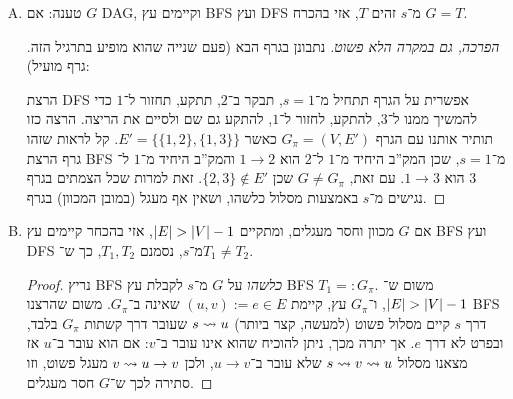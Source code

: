 \documentclass[]{../../../../tex/classes/homework}
\newcommand\ff{\mathrm{f}}
\begin{document}
\begin{enumerate}[(A)]
\begin{proof}[הוכחה בהנחה שהגרף פשוט]
			עתה נוכיח ש־$G$ חסר מעגלים. נניח בשלילה שב־$G$ יש מעגל באורך $n$. נניח שבזמן $t$ מתגלה הצומת הראשון במעגל $v_1$ (כלומר $\dd[v] = t$). בעת כלשהי בעת הרצת DFS-visit על $v$ (כלומר לפני $\ff[v]$), בהכרח נמצא $v_2$ כלשהו נוסף על המעגל, כי בינו לבין $v$ יש מסלול לבן בזמן $\dd[v]$. באינדוקציה, נבחין שבין $v_i$ לבין יתר צמתי המעגל שלא נמצאו יש מסלול לבן ב־$\dd[v_i]$, ולכן קיים $v_{i + 1}$ על המעגל שימצא לאחר $v_i$. סה''כ, נוכל למצוא קודקודים $v_1 \dots v_n$ כך ש־$I_{v_1} \subset I_{v_2} \subset \cdots \subset I_{v_n}$. כלומר, ישנו מסלול (מכוון ב־$G_{\pi}$, כי זהו תמיד גרף מכוון) $v_1 \to v_2 \squig v_n$, ומהשוויון, גם בגרף ה־BFS. מכאן שיש מק''ב $s \squig v_1 \squig v_n$, באורך $\dg(s, v_1) + n$, אך המסלול $s \squig v_1 \to v_n$ (שקיים כי $v_1 \dots v_n$ מעגל) קצר יותר (בהנחה ש־$n > 2$, שכן אחרת ישנן קשתות חוזרות והגרף איננו פשוט). 
		\end{proof}
		\item טענה: אם $G$ DAG, וקיימים עץ BFS ועץ DFS מ־$s$ זהים $T$, אזי בהכרח $G =T$.
		\begin{proof}[הפרכה, גם במקרה הלא פשוט]
			נתבונן בגרף הבא (פעם שנייה שהוא מופיע בתרגיל הזה. גרף מועיל): 
			\begin{center}
				\sen{}\she
			\end{center}
			הרצת DFS אפשרית על הגרף תתחיל מ־$s = 1$, תבקר ב־$2$, תתקע, תחזור ל־$1$ כדי להמשיך ממנו ל־$3$, להתקע, לחזור ל־$1$, להתקע גם שם ולסיים את הריצה. הרצה כזו תותיר אותנו עם הגרף $G_{\pi} = (V, E')$ כאשר $E' = \{\{1, 2\}, \{1, 3\}\}$. קל לראות שזהו גרף הרצת BFS מ־$s=1$, שכן המק''ב היחיד מ־$1$ ל־$2$ הוא $1 \to 2$ והמק''ב היחיד מ־$1$ ל־$3$ הוא $1 \to 3$. עם זאת, $G \neq G_\pi$ שכן $\{2, 3\} \notin E'$. זאת למרות שכל הצמתים בגרף נגישים מ־$s$ באמצעות מסלול כלשהו, ושאין אף מעגל (במובן המכוון) בגרף. 
		\end{proof}
		\item אם $G$ מכוון וחסר מעגלים, ומתקיים $\left \lvert E \right \rvert > \left \lvert V \right \rvert - 1$, אזי בהכחר קיימים עץ BFS ועץ DFS מ־$s$, נסמנם $T_1, T_2$, כך ש־$T_1 \neq T_2$. 
		\begin{proof}
			נריץ BFS \textit{כלשהו} על $G$ מ־$s$ לקבלת עץ BFS $T_1 =: G_\pi$. משום ש־$\left \lvert E \right \rvert > \left \lvert V \right \rvert - 1$, ו־$G_\pi$ עץ, קיימת $(u, v) := e \in E$ שאינה ב־$G_\pi$. משום שהרצנו BFS דרך $s$ קיים מסלול פשוט (למעשה, קצר ביותר) $s \rightsquigarrow u$ שעובר דרך קשתות $G_\pi$ בלבד, ובפרט לא דרך $e$. אך יתרה מכך, ניתן להוכיח שהוא אינו עובר ב־$v$: אם הוא עובר ב־$u$ אז מצאנו מסלול $s \rightsquigarrow v \rightsquigarrow u$ שלא עובר ב־$u \to v$, ולכן $v \rightsquigarrow u \to v$ מעגל פשוט, וזו סתירה לכך ש־$G$ חסר מעגלים. 
			

\end{proof}
\end{enumerate}
\end{document}
